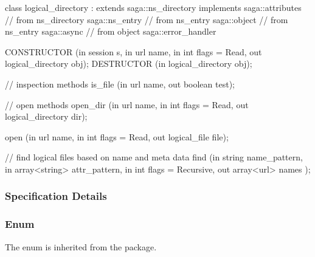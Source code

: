 \begin{myspec}
{ 
    class logical_directory : extends            saga::ns_directory
                              implements         saga::attributes
                           // from ns_directory  saga::ns_entry
                           // from ns_entry      saga::object
                           // from ns_entry      saga::async
                           // from object        saga::error_handler
    {
 
      CONSTRUCTOR     (in  session             s,
                       in  url                 name,
                       in  int                 flags = Read,
                       out logical_directory   obj);
      DESTRUCTOR      (in  logical_directory   obj);
 
 
      // inspection methods
      is_file         (in  url                 name,
                       out boolean             test);
 
      // open methods
      open_dir        (in  url                 name,
                       in  int                 flags = Read,
                       out logical_directory   dir);
 
      open            (in  url                 name,
                       in  int                 flags = Read,
                       out logical_file        file);
 
      // find logical files based on name and meta data
      find            (in  string              name_pattern,
                       in  array<string>       attr_pattern,
                       in  int                 flags = Recursive,
                       out array<url>          names   );
    }
  }
 \end{myspec}
 
 
 \subsubsection{Specification Details}
 
  \subsubsection*{Enum }
 
   The  enum is inherited from the 
   package.  
  
